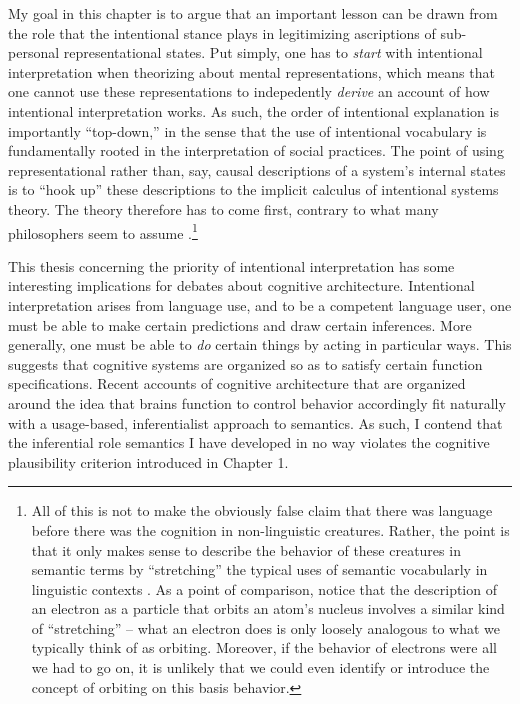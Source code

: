 My goal in this chapter is to argue that an important lesson can be drawn from the role that the intentional stance plays in legitimizing ascriptions of sub-personal representational states. Put simply, one has to \textit{start} with intentional interpretation when theorizing about mental representations, which means that one cannot use these representations to indepedently \textit{derive} an account of how intentional interpretation works. As such, the order of intentional explanation is importantly ``top-down,'' in the sense that the use of intentional vocabulary is fundamentally rooted in the interpretation of social practices. The point of using representational rather than, say, causal descriptions of a system's internal states is to ``hook up'' these descriptions to the implicit calculus of intentional systems theory. The theory therefore has to come first, contrary to what many philosophers seem to assume \citep[e.g.,][]{Millikan:1989,Fodor:1998}.\footnote{All of this is not to make the obviously false claim that there was language before there was the cognition in non-linguistic creatures. Rather, the point is that it only makes sense to describe the behavior of these creatures in semantic terms by ``stretching'' the typical uses of semantic vocabularly in linguistic contexts \citep[][p. 59]{Dennett:2010,Brandom:2010}. As a point of comparison, notice that the description of an electron as a particle that orbits an atom's nucleus involves a similar kind of ``stretching'' -- what an electron does is only loosely analogous to what we typically think of as orbiting. Moreover, if the behavior of electrons were all we had to go on, it is unlikely that we could even identify or introduce the concept of orbiting on this basis behavior.}

This thesis concerning the priority of intentional interpretation has some interesting implications for debates about cognitive architecture. Intentional interpretation arises from language use, and to be a competent language user, one must be able to make certain predictions and draw certain inferences. More generally, one must be able to \textit{do} certain things by acting in particular ways. This suggests that cognitive systems are organized so as to satisfy certain function specifications. Recent accounts of cognitive architecture that are organized around the idea that brains function to control behavior \citep[e.g.,][]{Eliasmith:2003} accordingly fit naturally with a usage-based, inferentialist approach to semantics. As such, I contend that the inferential role semantics I have developed in no way violates the cognitive plausibility criterion introduced in Chapter 1.  

